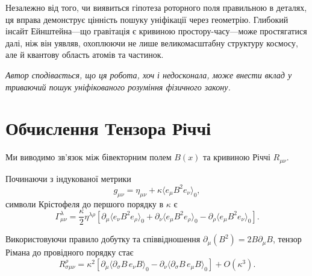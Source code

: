 \documentclass[11pt,a4paper]{article}
\numberwithin{equation}{section}
\theoremstyle{plain}
\theoremstyle{definition}
\theoremstyle{remark}
\newif\ifack
\begin{document}
Незалежно від того, чи виявиться гіпотеза роторного поля правильною в деталях, ця вправа демонструє цінність пошуку уніфікації через геометрію. Глибокий інсайт Ейнштейна---що гравітація є кривиною простору-часу---може простягатися далі, ніж він уявляв, охоплюючи не лише великомасштабну структуру космосу, але й квантову область атомів та частинок.

\medskip
\noindent\textit{Автор сподівається, що ця робота, хоч і недосконала, може внести вклад у триваючий пошук уніфікованого розуміння фізичного закону.}

\ifack
\section*{Подяки}
Автор вдячний піонерській роботі Девіда Хестенса та колег у розробці геометричної алгебри як мови для фізики. Подяка належить колабораціям LIGO та Virgo за надання даних гравітаційних хвиль у публічний доступ. Ця робота проводилась незалежно без зовнішнього фінансування.
\fi

\appendix
\section{Обчислення Тензора Річчі}
\label{app:ricci}

Ми виводимо зв'язок між бівекторним полем $B(x)$ та кривиною Річчі $R_{\mu\nu}$.

Починаючи з індукованої метрики
\begin{equation}
g_{\mu\nu} = \eta_{\mu\nu} + \kappa \langle e_\mu B^2 e_\nu \rangle_0,
\end{equation}
символи Крістофеля до першого порядку в $\kappa$ є
\begin{equation}
\Gamma^\lambda_{\mu\nu} = \frac{\kappa}{2} \eta^{\lambda\rho} \left[\partial_\mu \langle e_\nu B^2 e_\rho \rangle_0 + \partial_\nu \langle e_\mu B^2 e_\rho \rangle_0 - \partial_\rho \langle e_\mu B^2 e_\nu \rangle_0\right].
\end{equation}

Використовуючи правило добутку та співвідношення $\partial_\mu (B^2) = 2 B \partial_\mu B$, тензор Рімана до провідного порядку стає
\begin{equation}
R^\rho_{\sigma\mu\nu} = \kappa^2 \left[\partial_\mu \langle \partial_\sigma B \, e_\nu B \rangle_0 - \partial_\nu \langle \partial_\sigma B \, e_\mu B \rangle_0\right] + O(\kappa^3).
\end{equation}
\end{document}
